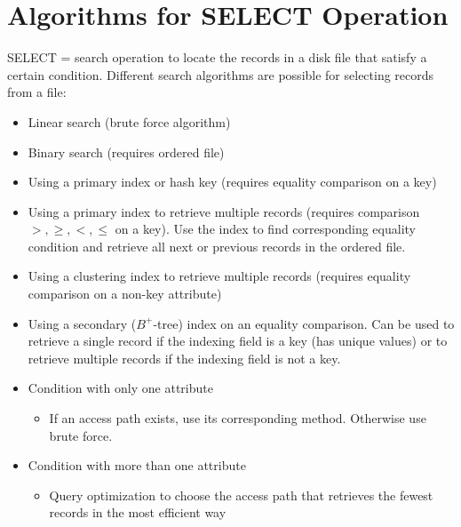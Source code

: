 \section{Algorithms for SELECT Operation}
SELECT = search operation to locate the records in a disk file that satisfy a certain condition. Different search algorithms are possible for selecting records from a file:
\begin{itemize}
    \item Linear search (brute force algorithm)
    \item Binary search (requires ordered file)
    \item Using a primary index or hash key (requires equality comparison on a key)
    \item Using a primary index to retrieve multiple records (requires comparison $>,\geq, <, \leq$ on a key). Use the index to find corresponding equality condition and retrieve all next or previous records in the ordered file.
    \item Using a clustering index to retrieve multiple records (requires equality comparison on a non-key attribute)
    \item Using a secondary ($B^+$-tree) index on an equality comparison. Can be used to retrieve a single record if the indexing field is a key (has unique values) or to retrieve multiple records if the indexing field is not a key.
\end{itemize}

\begin{itemize}
    \item Condition with only one attribute
    \begin{itemize}
        \item If an access path exists, use its corresponding method. Otherwise use brute force.
    \end{itemize}
    \item Condition with more than one attribute
    \begin{itemize}
        \item Query optimization to choose the access path that retrieves the fewest records in the most efficient way 
    \end{itemize}
\end{itemize}


